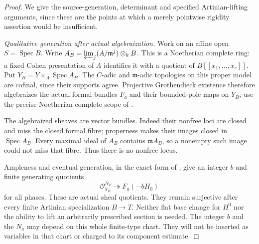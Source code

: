 \begin{proof}
We give the source-generation, determinant and specified
Artinian-lifting arguments, since these are the points
at which a merely pointwise rigidity assertion would
be insufficient.

\emph{Qualitative generation after actual algebraization.}
Work on an affine open $S=\operatorname{Spec}B$.
Write
$A_B=\varprojlim_j(A/\mathfrak m^j)\otimes_kB$.
This is a Noetherian complete ring: a fixed Cohen
presentation of $A$ identifies it with a quotient of
$B[[x_1,\ldots,x_e]]$. Put $Y_B=Y\times_A\operatorname{Spec}A_B$.
The $C$-adic and $\mathfrak m$-adic topologies on this
proper model are cofinal, since their supports agree.
Projective Grothendieck existence therefore algebraizes
the actual formal bundles $F_a$ and their bounded-pole
maps on $Y_B$; use the precise Noetherian complete scope
of \citet[Tag 0885, Lemma 30.24.3, complete proof]
{StacksRelativeKahnB}.

The algebraized sheaves are vector bundles. Indeed their
nonfree loci are closed and miss the closed formal fibre;
properness makes their images closed in $\operatorname{Spec}A_B$.
Every maximal ideal of $A_B$ contains
$\mathfrak m A_B$, so a nonempty such image could not
miss that fibre. Thus there is no nonfree locus.

Ampleness and eventual generation, in the exact form of
\citet[Tag 01PR, Proposition 28.27.13(7)--(8), complete proof]
{StacksCartierParametersRoot}, give an integer $b$ and
finite generating quotients
\[
           \mathcal O_{Y_B}^{N_a}\twoheadrightarrow
                         F_a(-bH_0)                  \tag{D.IP.9}
\]
for all phases. These are actual sheaf quotients.
They remain surjective after every finite Artinian
specialization $B\to T$. Neither flat base change for
$H^0$ nor the ability to lift an arbitrarily prescribed
section is needed. The integer $b$ and the $N_a$ may
depend on this whole finite-type chart. They will not
be inserted as variables in that chart or charged to
its component estimate.


\end{proof}
